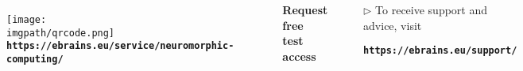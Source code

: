 \begin{myblock1}[noframenumbering]
    \frametitle{}

    \begin{columns}[c]

        \begin{figure}
            \centering                
            \texttt{[image: \\imgpath/qrcode.png]}\\
            \small{\texttt{\textbf{https://ebrains.eu/service/neuromorphic-computing/}}}
        \end{figure}
        \vspace{-5mm}
        \phantom{-}
   

            \textbf{\LARGE Request free test access \normalsize} \\[9mm]                      

            \begin{Large}
                \begin{itemize}
                    \item[$\triangleright$] To receive support and advice, visit \\[2mm] 
                    \item[] \texttt{\textbf{https://ebrains.eu/support/}}
                \end{itemize}                   
            \end{Large}
     
      
    \end{columns}

\end{myblock1}